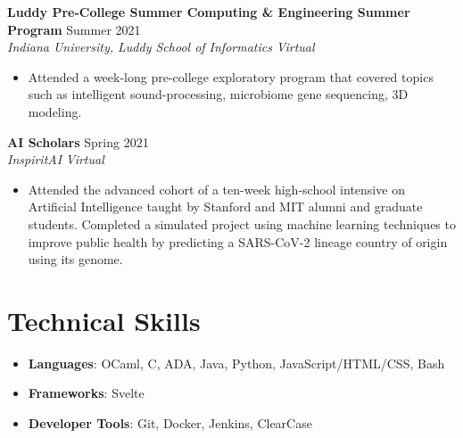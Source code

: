 \documentclass[letterpaper,8pt]{article}
\newcommand{\resumeEntry}[4]{
    \vspace{4pt}
    \large \textbf{#1}
    \normalsize \hfill #2
    \\
    \textit{#3} \hfill \textit{#4}
    \vspace{1pt}
}
\newcommand{\itemsBegin}{
    \begin{itemize}[leftmargin=0.2in, labelsep=0.05in, itemsep=0pt, parsep=1pt, topsep=0pt, partopsep=0pt]
}
\newcommand{\itemsEnd}{\end{itemize}}
\begin{document}
    \resumeEntry
        {Luddy Pre-College Summer Computing \& Engineering Summer Program}
        {Summer 2021}
        {Indiana University, Luddy School of Informatics}
        {Virtual}

    \itemsBegin
        \item Attended a week-long pre-college exploratory program that covered topics such as intelligent sound-processing, microbiome gene sequencing, 3D modeling.
    \itemsEnd


    \resumeEntry
        {AI Scholars}
        {Spring 2021}
        {InspiritAI}
        {Virtual}

    \itemsBegin
        \item Attended the advanced cohort of a ten-week high-school intensive on Artificial Intelligence taught by Stanford and MIT alumni and graduate students. Completed a simulated project using machine learning techniques to improve public health by predicting a SARS-CoV-2 lineage country of origin using its genome.
    \itemsEnd

\section{Technical Skills}

    \itemsBegin
        \item \textbf{Languages}{: OCaml, C, ADA, Java, Python, JavaScript/HTML/CSS, Bash}
        \item \textbf{Frameworks}{: Svelte}
        \item \textbf{Developer Tools}{: Git, Docker, Jenkins, ClearCase}
    \itemsEnd

\end{document}
